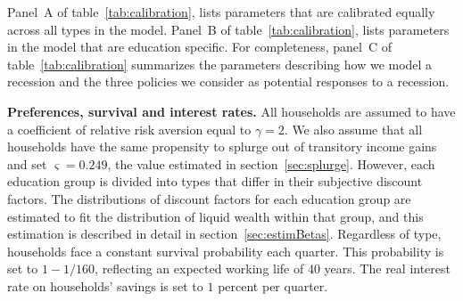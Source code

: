 \documentclass[\econtexRoot/HAFiscal]{subfiles}
\begin{document}
Panel~A of table~\ref{tab:calibration}, lists parameters that are calibrated equally across all types in the model.
Panel~B of table~\ref{tab:calibration}, lists parameters in the model that are education specific.
For completeness, panel~C of table~\ref{tab:calibration} summarizes the parameters describing how we model a recession and the three policies we consider as potential responses to a recession.


\textbf{Preferences, survival and interest rates.} All households are assumed to have a coefficient of relative risk aversion equal to $\gamma=2$.
We also assume that all households have the same propensity to splurge out of transitory income gains and set $\varsigma=0.249$, the value estimated in section~\ref{sec:splurge}.
However, each education group is divided into types that differ in their subjective discount factors.
The distributions of discount factors for each education group are estimated to fit the distribution of liquid wealth within that group, and this estimation is described in detail in section~\ref{sec:estimBetas}.
Regardless of type, households face a constant survival probability each quarter.
This probability is set to $1-1/160$, reflecting an expected working life of 40 years.
The real interest rate on households' savings is set to $1$ percent per quarter.
\end{document}
